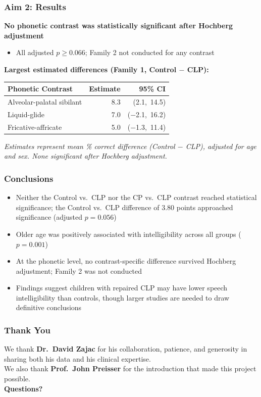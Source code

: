\documentclass{beamer}
\begin{document}
\begin{frame}
\frametitle{Aim 2: Results}
\textbf{No phonetic contrast was statistically significant after Hochberg adjustment}
\begin{itemize}
  \item All adjusted $p \geq 0.066$; Family 2 not conducted for any contrast
\end{itemize}
\vspace{0.4em}
\textbf{Largest estimated differences (Family 1, Control $-$ CLP):}
\renewcommand{\arraystretch}{1.2}
\begin{center}
\small
\begin{tabular}{@{}lrr@{}}
\toprule
\textbf{Phonetic Contrast} & \textbf{Estimate} & \textbf{95\% CI} \\
\midrule
Alveolar-palatal sibilant & 8.3 & (2.1,\ 14.5) \\
Liquid-glide              & 7.0 & ($-$2.1,\ 16.2) \\
Fricative-affricate       & 5.0 & ($-$1.3,\ 11.4) \\
\bottomrule
\end{tabular}
\end{center}
\normalsize
\vspace{0.2em}
{\small \textit{Estimates represent mean \% correct difference (Control $-$ CLP), adjusted for age and sex. None significant after Hochberg adjustment.}}
\end{frame}
\begin{frame}
\frametitle{Conclusions}
\begin{itemize}
  \item Neither the Control vs.\ CLP nor the CP vs.\ CLP contrast reached statistical significance; the Control vs.\ CLP difference of 3.80 points approached significance (adjusted $p = 0.056$)
  \item Older age was positively associated with intelligibility across all groups ($p = 0.001$)
  \item At the phonetic level, no contrast-specific difference survived Hochberg adjustment; Family 2 was not conducted
  \item Findings suggest children with repaired CLP may have lower speech intelligibility than controls, though larger studies are needed to draw definitive conclusions
\end{itemize}
\end{frame}
\begin{frame}
\frametitle{Thank You}
\begin{center}
  \vspace{0.5em}
  We thank \textbf{Dr.\ David Zajac} for his collaboration, patience, and generosity in sharing both his data and his clinical expertise.\\[0.5em]
  We also thank \textbf{Prof.\ John Preisser} for the introduction that made this project possible.\\[1em]
  \textbf{Questions?}\\[2em]
\end{center}
\end{frame}
\end{document}
